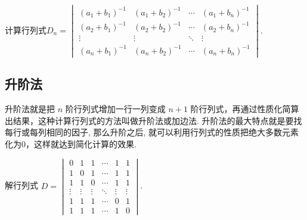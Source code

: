 \begin{example}{}{}
    计算行列式$D_n=\begin{vmatrix}
            (a_1 + b_1)^{-1} & (a_1 + b_2)^{-1} & \cdots & (a_1 + b_n)^{-1} \\
            (a_2 + b_1)^{-1} & (a_2 + b_2)^{-1} & \cdots & (a_2 + b_n)^{-1} \\
            \vdots            & \vdots            & \ddots & \vdots            \\
            (a_n + b_1)^{-1} & (a_n + b_2)^{-1} & \cdots & (a_n + b_n)^{-1}
        \end{vmatrix}$.
\end{example}

\subsection{升阶法}

升阶法就是把 $n$ 阶行列式增加一行一列变成 $n+1$ 阶行列式，再通过性质化简算出结果，这种计算行列式的方法叫做升阶法或加边法. 升阶法的最大特点就是要找每行或每列相同的因子, 那么升阶之后, 就可以利用行列式的性质把绝大多数元素化为0，这样就达到简化计算的效果.

\begin{example}{}{}
    解行列式 $D=\begin{vmatrix}
            0      & 1      & 1      & \cdots & 1      & 1      \\
            1      & 0      & 1      & \cdots & 1      & 1      \\
            1      & 1      & 0      & \cdots & 1      & 1      \\
            \vdots & \vdots & \vdots & \ddots & \vdots & \vdots \\
            1      & 1      & 1      & \cdots & 0      & 1      \\
            1      & 1      & 1      & \cdots & 1      & 0
        \end{vmatrix}$.
\end{example}

